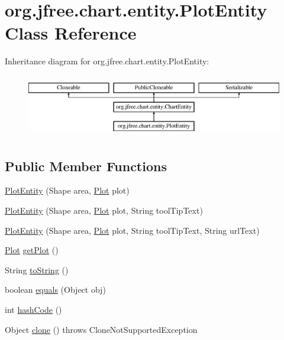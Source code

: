 \hypertarget{classorg_1_1jfree_1_1chart_1_1entity_1_1_plot_entity}{}\section{org.\+jfree.\+chart.\+entity.\+Plot\+Entity Class Reference}
\label{classorg_1_1jfree_1_1chart_1_1entity_1_1_plot_entity}
Inheritance diagram for org.\+jfree.\+chart.\+entity.\+Plot\+Entity\+:\begin{figure}[H]
\begin{center}
\leavevmode
\includegraphics[height=2.772277cm]{classorg_1_1jfree_1_1chart_1_1entity_1_1_plot_entity}
\end{center}
\end{figure}
\subsection*{Public Member Functions}
\begin{DoxyCompactItemize}
\item 
\mbox{\hyperlink{classorg_1_1jfree_1_1chart_1_1entity_1_1_plot_entity_acb6a930470b120a64340463821abe8b0}{Plot\+Entity}} (Shape area, \mbox{\hyperlink{classorg_1_1jfree_1_1chart_1_1plot_1_1_plot}{Plot}} plot)
\item 
\mbox{\hyperlink{classorg_1_1jfree_1_1chart_1_1entity_1_1_plot_entity_abe4fd652795c63a34e8bd65788533c30}{Plot\+Entity}} (Shape area, \mbox{\hyperlink{classorg_1_1jfree_1_1chart_1_1plot_1_1_plot}{Plot}} plot, String tool\+Tip\+Text)
\item 
\mbox{\hyperlink{classorg_1_1jfree_1_1chart_1_1entity_1_1_plot_entity_ae154a34410ce83b0925784f98417b766}{Plot\+Entity}} (Shape area, \mbox{\hyperlink{classorg_1_1jfree_1_1chart_1_1plot_1_1_plot}{Plot}} plot, String tool\+Tip\+Text, String url\+Text)
\item 
\mbox{\hyperlink{classorg_1_1jfree_1_1chart_1_1plot_1_1_plot}{Plot}} \mbox{\hyperlink{classorg_1_1jfree_1_1chart_1_1entity_1_1_plot_entity_a8fc50155cb1968b3a98279b9fd59e410}{get\+Plot}} ()
\item 
String \mbox{\hyperlink{classorg_1_1jfree_1_1chart_1_1entity_1_1_plot_entity_a1eba11b30586682d32571c8d7c678816}{to\+String}} ()
\item 
boolean \mbox{\hyperlink{classorg_1_1jfree_1_1chart_1_1entity_1_1_plot_entity_a9a140b9472c1221ff452f1c1a31bf337}{equals}} (Object obj)
\item 
int \mbox{\hyperlink{classorg_1_1jfree_1_1chart_1_1entity_1_1_plot_entity_aaa0ebd4eea2bd9ab4151fe570e8f7e16}{hash\+Code}} ()
\item 
Object \mbox{\hyperlink{classorg_1_1jfree_1_1chart_1_1entity_1_1_plot_entity_ac658bc459dd65a26b8597e05e450bbb3}{clone}} ()  throws Clone\+Not\+Supported\+Exception 
\end{DoxyCompactItemize}


